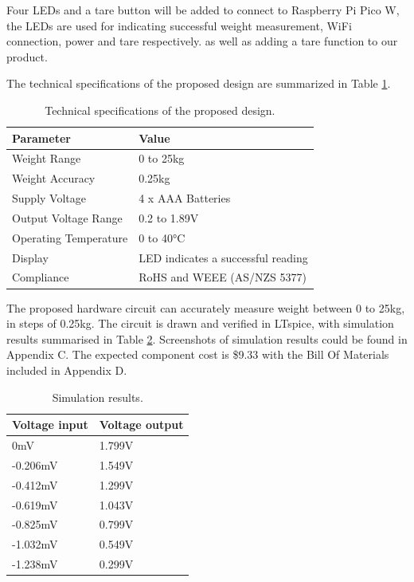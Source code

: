 Four LEDs and a tare button will be added to connect to Raspberry Pi Pico W, the LEDs are used for indicating successful weight measurement, WiFi connection, power and tare respectively. as well as adding a tare function to our product.

The technical specifications of the proposed design are summarized in Table \ref{table:tech specs}.

\begin{table}[h]
\begin{center}
\begin{tabular}{|l|l|}
    \hline
    Parameter & Value \\
    \hline
    Weight Range & 0 to 25kg \\
    Weight Accuracy & 0.25kg \\
    Supply Voltage & 4 x AAA Batteries \\
    Output Voltage Range & 0.2 to 1.89V \\
    Operating Temperature & 0 to 40°C \\
    Display & LED indicates a successful reading \\
    Compliance & RoHS and WEEE (AS/NZS 5377) \\
    \hline
\end{tabular}
\caption{Technical specifications of the proposed design.}
\label{table:tech specs}
\end{center}
\end{table}

The proposed hardware circuit can accurately measure weight between 0 to 25kg, in steps of 0.25kg. The circuit is drawn and verified in LTspice, with simulation results summarised in Table \ref{table:simulation}. Screenshots of simulation results could be found in Appendix C. The expected component cost is \$9.33 with the Bill Of Materials included in Appendix D.

\begin{table}[h]
    \begin{center}
    \begin{tabular}{|l|l|}
        \hline
        Voltage input & Voltage output \\
        \hline
        0mV & 1.799V \\
        -0.206mV & 1.549V \\
        -0.412mV & 1.299V \\
        -0.619mV & 1.043V \\
        -0.825mV & 0.799V \\
        -1.032mV & 0.549V \\
        -1.238mV & 0.299V \\
        \hline
    \end{tabular}
    \caption{Simulation results.}
    \label{table:simulation}
    \end{center}
\end{table}
